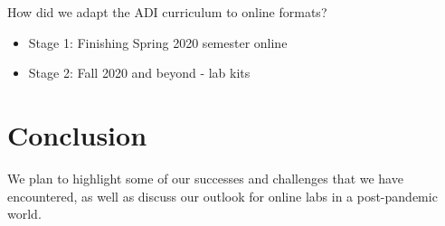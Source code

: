 \documentclass{article}
\begin{document}
How did we adapt the ADI curriculum to online formats?
\begin{itemize}
  \item Stage 1: Finishing Spring 2020 semester online
  \item Stage 2: Fall 2020 and beyond - lab kits
\end{itemize}

\section{Conclusion}
We plan to highlight some of our successes and challenges that we have encountered, as well as
discuss our outlook for online labs in a post-pandemic world.
\end{document}
